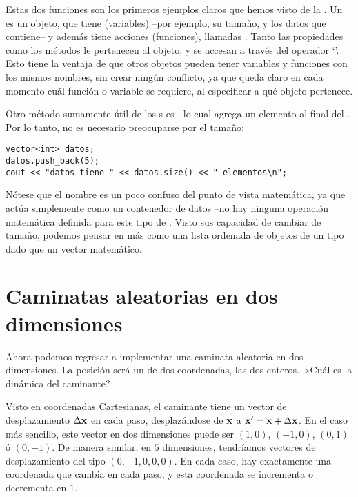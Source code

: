 Estas dos funciones son los primeros ejemplos claros que hemos visto de la
. Un  es un objeto, que
tiene  (variables) --por ejemplo, su tamaño, y los datos que
contiene-- y además tiene acciones (funciones), llamadas . Tanto
las propiedades como los métodos le pertenecen al objeto, y se accesan a través
del operador `'. 
Esto tiene la ventaja de que otros objetos pueden tener variables y funciones
con los mismos nombres, sin crear ningún conflicto, ya que queda claro en cada
momento cuál función o variable se requiere, al especificar a qué objeto
pertenece.

Otro método sumamente útil de los s es , lo cual
agrega un elemento al final del
. Por lo tanto, no es necesario preocuparse por el tamaño:
\begin{lstlisting}
vector<int> datos;
datos.push_back(5);
cout << "datos tiene " << datos.size() << " elementos\n";
\end{lstlisting}



Nótese que el nombre  es un poco confuso del punto de vista
matemática, ya que actúa simplemente como un contenedor de datos --no hay
ninguna operación matemática definida para este tipo de .
Visto sus capacidad de cambiar de tamaño, podemos pensar en  más
como una lista ordenada de objetos de un tipo dado que un vector matemático.

\section{Caminatas aleatorias en dos dimensiones}
Ahora podemos regresar a implementar una caminata aleatoria en dos dimensiones.
La posición será un  de dos coordenadas, las dos enteros. >Cuál es
la dinámica del caminante? 

Visto en coordenadas Cartesianas, el caminante tiene un vector de
desplazamiento $\Delta \mathbf{x}$ en cada paso, desplazándose de $\mathbf{x}$ a $\mathbf{x}' = \mathbf{x}
+ \Delta \mathbf{x}$. En el caso más sencillo, este vector en dos dimensiones puede
ser $(1,0)$, $(-1, 0)$, $(0, 1)$ ó $(0,-1)$.  De manera similar, en $5$
dimensiones, tendríamos vectores de desplazamiento del tipo $(0,-1,0,0,0)$. En
cada caso, hay exactamente una coordenada que cambia en cada paso, y esta
coordenada se incrementa o decrementa en $1$.

